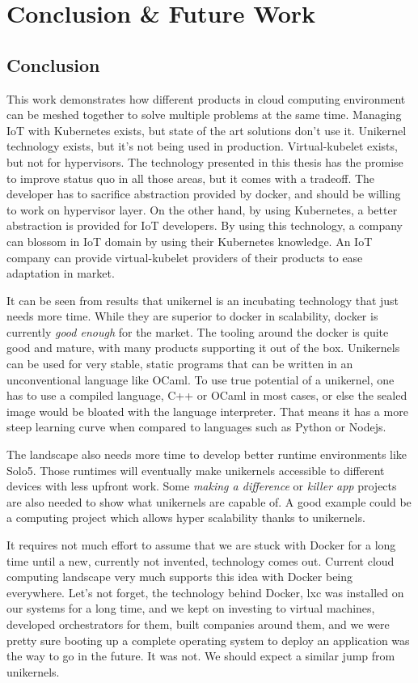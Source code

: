 \chapter{Conclusion \& Future Work}\label{chapter:conclusion}
\section{Conclusion}
This work demonstrates how different products in cloud computing environment can be meshed together to solve multiple problems at the same time. Managing IoT with Kubernetes exists, but state of the art solutions don't use it. Unikernel technology exists, but it's not being used in production. Virtual-kubelet exists, but not for hypervisors. The technology presented in this thesis has the promise to improve status quo in all those areas, but it comes with a tradeoff. The developer has to sacrifice abstraction provided by docker, and should be willing to work on hypervisor layer. On the other hand, by using Kubernetes, a better abstraction is provided for IoT developers. By using this technology, a company can blossom in IoT domain by using their Kubernetes knowledge. An IoT company can provide virtual-kubelet providers of their products to ease adaptation in market.

It can be seen from results that unikernel is an incubating technology that just needs more time. While they are superior to docker in scalability, docker is currently \textit{good enough} for the market. The tooling around the docker is quite good and mature, with many products supporting it out of the box. Unikernels can be used for very stable, static programs that can be written in an unconventional language like OCaml. To use true potential of a unikernel, one has to use a compiled language, C++ or OCaml in most cases, or else the sealed image would be bloated with the language interpreter. That means it has a more steep learning curve when compared to languages such as Python or Nodejs.

The landscape also needs more time to develop better runtime environments like Solo5. Those runtimes will eventually make unikernels accessible to different devices with less upfront work. Some \textit{making a difference} or \textit{killer app} projects are also needed to show what unikernels are capable of. A good example could be a computing project which allows hyper scalability thanks to unikernels.

It requires not much effort to assume that we are stuck with Docker for a long time until a new, currently not invented, technology comes out. Current cloud computing landscape very much supports this idea with Docker being everywhere. Let's not forget, the technology behind Docker, lxc was installed on our systems for a long time, and we kept on investing to virtual machines, developed orchestrators for them, built companies around them, and we were pretty sure booting up a complete operating system to deploy an application was the way to go in the future. It was not. We should expect a similar jump from unikernels.

